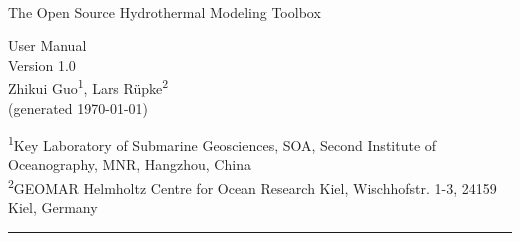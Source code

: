 {

\begin{center}
\\[12pt]
{\Large \fontfamily{\sfdefault}\selectfont The Open Source Hydrothermal Modeling Toolbox}
\end{center}

\vspace{10em}
\begin{center}
	\color{dark_grey}
	{\Huge \fontfamily{\sfdefault}\selectfont User Manual \\
		\vspace{1em}
		\huge \fontfamily{\sfdefault}\selectfont Version 1.0 \\
		\vspace{1em}
		{\Large Zhikui Guo\textsuperscript{1}, Lars Rüpke\textsuperscript{2} \\}
		\vspace{1em}
		\large(generated \today)\\
	}
\end{center}

\null
\vspace{18em}
\color{dark_grey}

{\noindent
{\fontfamily{\sfdefault}\selectfont 
\textsuperscript{1}Key Laboratory of Submarine Geosciences, SOA, Second Institute of Oceanography, MNR, Hangzhou, China \\ 
\textsuperscript{2}GEOMAR Helmholtz Centre for Ocean Research Kiel, Wischhofstr. 1-3, 24159 Kiel, Germany
}

}

{\noindent
\color{dark_grey}
\rule{\textwidth}{2pt}
}

}